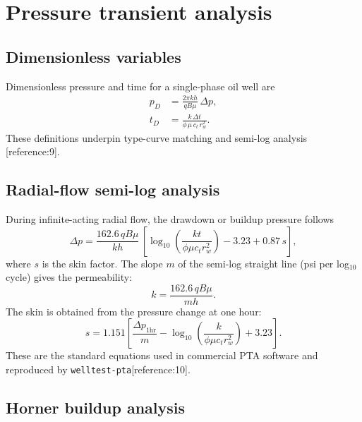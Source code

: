 \documentclass[10pt,a4paper]{article}
\begin{document}
\section{Pressure transient analysis}

\subsection{Dimensionless variables}

Dimensionless pressure and time for a single-phase oil well are
\begin{align}
  p_D &= \frac{2\pi k h}{q B \mu}\,\Delta p, \label{eq:pd}\\
  t_D &= \frac{k\,\Delta t}{\phi\,\mu\,c_t\,r_w^2}. \label{eq:td}
\end{align}
These definitions underpin type-curve matching and semi-log analysis
[reference:9].

\subsection{Radial-flow semi-log analysis}

During infinite-acting radial flow, the drawdown or buildup pressure follows
\begin{equation}
  \Delta p = \frac{162.6\,q B \mu}{k h}\,
  \left[\log_{10}\!\left(\frac{k t}{\phi \mu c_t r_w^2}\right) - 3.23 + 0.87\,s\right],
  \label{eq:semilog}
\end{equation}
where $s$ is the skin factor. The slope $m$ of the semi-log straight line
(psi per log$_{10}$ cycle) gives the permeability:
\begin{equation}
  k = \frac{162.6\,q B \mu}{m h}.
  \label{eq:k-semilog}
\end{equation}
The skin is obtained from the pressure change at one hour:
\begin{equation}
  s = 1.151\left[\frac{\Delta p_{1\mathrm{hr}}}{m}
  - \log_{10}\!\left(\frac{k}{\phi \mu c_t r_w^2}\right) + 3.23\right].
  \label{eq:skin}
\end{equation}
These are the standard equations used in commercial PTA software and reproduced
by \texttt{welltest-pta}[reference:10].

\subsection{Horner buildup analysis}
\end{document}
